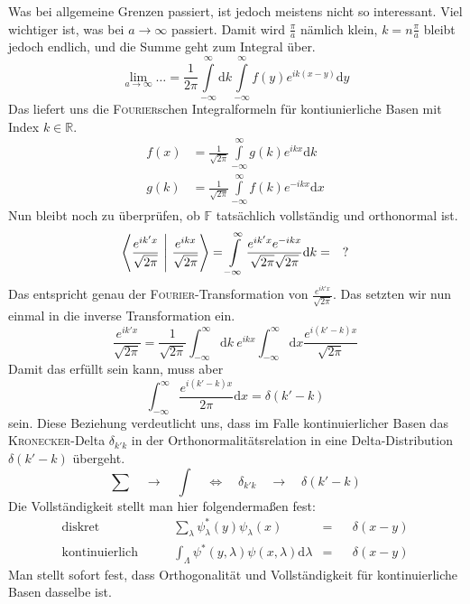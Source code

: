 \documentclass[a4paper,12pt,portrait]{book}
\numberwithin{equation}{section}
\begin{document}
Was bei allgemeine Grenzen passiert, ist jedoch meistens nicht so interessant. Viel wichtiger ist, was bei $a\rightarrow\infty$ passiert. Damit wird $\frac{\pi}{a}$ nämlich klein, $k=n\frac{\pi}{a}$ bleibt jedoch endlich, und die Summe geht zum Integral über.
\begin{equation*}
\lim\limits_{a\rightarrow\infty} \hdots = \frac{1}{2\pi}\int\limits_{-\infty}^\infty\mathrm{d}k\int\limits_{-\infty}^\infty f(y)e^{ik(x-y)}\mathrm{d}y
\end{equation*}
Das liefert uns die \textsc{Fourier}schen Integralformeln für kontiunierliche Basen mit Index $k\in\mathbb{R}$.
\begin{align*}
f(x) &= \frac{1}{\sqrt{2\pi}}\int\limits_{-\infty}^\infty g(k) e^{ikx}\mathrm{d}k \\
g(k) &= \frac{1}{\sqrt{2\pi}}\int\limits_{-\infty}^\infty f(k) e^{-ikx}\mathrm{d}x
\end{align*}
Nun bleibt noch zu überprüfen, ob $\mathbb{F}$ tatsächlich vollständig und orthonormal ist. 
\begin{equation*}
\left\langle \frac{e^{ik'x}}{\sqrt{2\pi}} \ \middle| \ \frac{e^{ikx}}{\sqrt{2\pi}}\right\rangle =  \int\limits_{-\infty}^\infty \frac{e^{ik'x}e^{-ikx}}{\sqrt{2\pi}\sqrt{2\pi}} \mathrm{d}k= \quad?
\end{equation*}
Das entspricht genau der \textsc{Fourier}-Transformation von $\frac{e^{ik'x}}{\sqrt{2\pi}}$. Das setzten wir nun einmal in die inverse Transformation ein.
\begin{equation*}
\frac{e^{ik'x}}{\sqrt{2\pi}}=\frac{1}{\sqrt{2\pi}}\int_{-\infty}^{\infty}\mathrm{d}k\ e^{ikx} \int_{-\infty}^{\infty}\mathrm{d}x \frac{e^{i(k'-k)x}}{\sqrt{2\pi}}
\end{equation*}
Damit das erfüllt sein kann, muss aber
\begin{equation*}
\int_{-\infty}^{\infty}\frac{e^{i(k'-k)x}}{2\pi}\mathrm{d}x = \delta(k'-k)
\end{equation*}
sein. Diese Beziehung verdeutlicht uns, dass im Falle kontinuierlicher Basen das \textsc{Kronecker}-Delta $\delta_{k'k}$ in der Orthonormalitätsrelation in eine Delta-Distribution $\delta(k'-k)$ übergeht.
\begin{equation*}
\sum\quad\rightarrow\quad\int \quad\Longleftrightarrow \quad \delta_{k'k} \quad\rightarrow\quad \delta(k'-k)
\end{equation*}
Die Vollständigkeit stellt man hier folgendermaßen fest:
\begin{align*}
\text{diskret} \qquad & \sum\limits_{\lambda}\psi_\lambda^*(y) \psi_\lambda(x) & =&  &\delta(x-y)\\
\text{kontinuierlich} \qquad & \int_\Lambda \psi^*(y,\lambda)\psi(x,\lambda)\mathrm{d}\lambda &=& &\delta(x-y)
\end{align*}
Man stellt sofort fest, dass Orthogonalität und Vollständigkeit für kontinuierliche Basen dasselbe ist.
\end{document}
